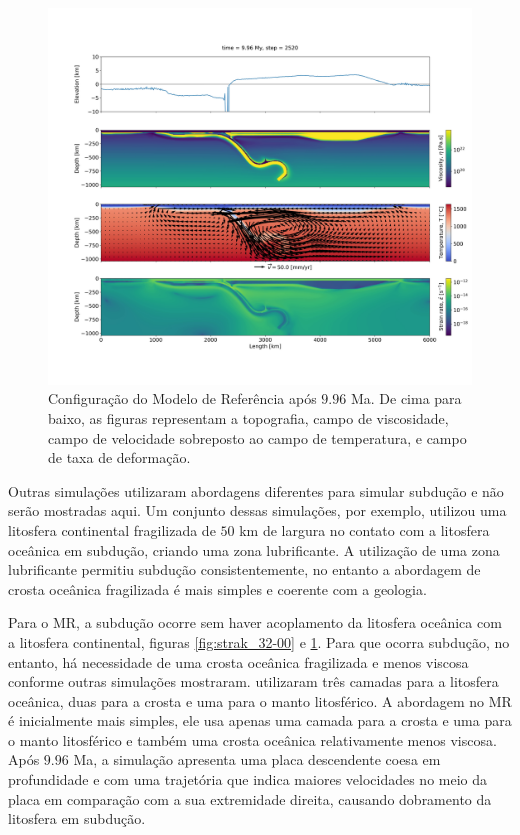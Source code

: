 \begin{figure}
    \centering
    \includegraphics[trim={5cm 14cm 2cm 12cm}, clip, width=1.0 \textwidth]{fig/strak_32-11.png}
    \caption{Configuração do Modelo de Referência após $9.96$ Ma. De cima para baixo, as figuras representam a topografia, campo de viscosidade, campo de velocidade sobreposto ao campo de temperatura, e campo de taxa de deformação.}
    \label{fig:strak_32-11}
\end{figure}

Outras simulações utilizaram abordagens diferentes para simular subdução e não serão mostradas aqui. Um conjunto dessas simulações, por exemplo, utilizou uma litosfera continental fragilizada de $50$ km de largura no contato com a litosfera oceânica em subdução, criando uma zona lubrificante. A utilização de uma zona lubrificante permitiu subdução consistentemente, no entanto a abordagem de crosta oceânica fragilizada é mais simples e coerente com a geologia.

Para o MR, a subdução ocorre sem haver acoplamento da litosfera oceânica com a litosfera continental, figuras \ref{fig:strak_32-00} e \ref{fig:strak_32-11}. Para que ocorra subdução, no entanto, há necessidade de uma crosta oceânica fragilizada e menos viscosa conforme outras simulações mostraram. \citet{strak2021thermo} utilizaram três camadas para a litosfera oceânica, duas para a crosta e uma para o manto litosférico. A abordagem no MR é inicialmente mais simples, ele usa apenas uma camada para a crosta e uma para o manto litosférico e também uma crosta oceânica relativamente menos viscosa. Após $9.96$ Ma, a simulação apresenta uma placa descendente coesa em profundidade e com uma trajetória que indica maiores velocidades no meio da placa em comparação com a sua extremidade direita, causando dobramento da litosfera em subdução.

